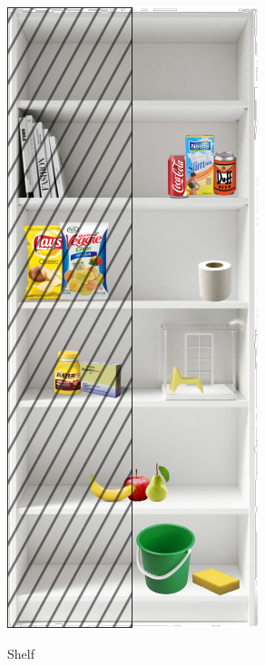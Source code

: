 \begin{minipage}{0.25\textwidth}
	\begin{figure}[H]
		\centering
		\includegraphics[width=\textwidth]{images/storing_groceries.png}%
		\vspace{-10pt}
		\label{fig:storing_groceries}
		\caption{Shelf}
	\end{figure}
\end{minipage}


